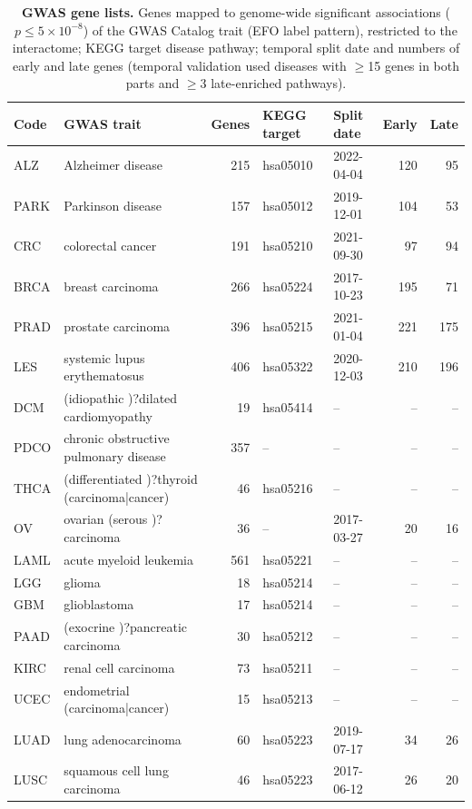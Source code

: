\begin{table}[h]\centering\small
\caption{\textbf{GWAS gene lists.} Genes mapped to genome-wide significant associations ($p\le5\times10^{-8}$) of the GWAS Catalog trait (EFO label pattern), restricted to the interactome; KEGG target disease pathway; temporal split date and numbers of early and late genes (temporal validation used diseases with $\ge$15 genes in both parts and $\ge$3 late-enriched pathways).}
\label{tab:s1}
\begin{tabular}{llrllrr}\toprule
Code & GWAS trait & Genes & KEGG target & Split date & Early & Late\\\midrule
ALZ & Alzheimer disease & 215 & hsa05010 & 2022-04-04 & 120 & 95\\
PARK & Parkinson disease & 157 & hsa05012 & 2019-12-01 & 104 & 53\\
CRC & colorectal cancer & 191 & hsa05210 & 2021-09-30 & 97 & 94\\
BRCA & breast carcinoma & 266 & hsa05224 & 2017-10-23 & 195 & 71\\
PRAD & prostate carcinoma & 396 & hsa05215 & 2021-01-04 & 221 & 175\\
LES & systemic lupus erythematosus & 406 & hsa05322 & 2020-12-03 & 210 & 196\\
DCM & (idiopathic )?dilated cardiomyopathy & 19 & hsa05414 & -- & -- & --\\
PDCO & chronic obstructive pulmonary disease & 357 & -- & -- & -- & --\\
THCA & (differentiated )?thyroid (carcinoma|cancer) & 46 & hsa05216 & -- & -- & --\\
OV & ovarian (serous )?carcinoma & 36 & -- & 2017-03-27 & 20 & 16\\
LAML & acute myeloid leukemia & 561 & hsa05221 & -- & -- & --\\
LGG & glioma & 18 & hsa05214 & -- & -- & --\\
GBM & glioblastoma & 17 & hsa05214 & -- & -- & --\\
PAAD & (exocrine )?pancreatic carcinoma & 30 & hsa05212 & -- & -- & --\\
KIRC & renal cell carcinoma & 73 & hsa05211 & -- & -- & --\\
UCEC & endometrial (carcinoma|cancer) & 15 & hsa05213 & -- & -- & --\\
LUAD & lung adenocarcinoma & 60 & hsa05223 & 2019-07-17 & 34 & 26\\
LUSC & squamous cell lung carcinoma & 46 & hsa05223 & 2017-06-12 & 26 & 20\\

\end{tabular}
\end{table}
